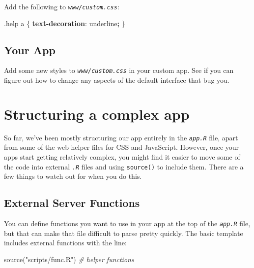 \documentclass[
  oneside]{book}
\newenvironment{Shaded}{\begin{snugshade}}{\end{snugshade}}
\newcommand{\CommentTok}[1]{\textcolor[rgb]{0.56,0.35,0.01}{\textit{#1}}}
\newcommand{\DecValTok}[1]{\textcolor[rgb]{0.00,0.00,0.81}{#1}}
\newcommand{\FunctionTok}[1]{\textcolor[rgb]{0.00,0.00,0.00}{#1}}
\newcommand{\KeywordTok}[1]{\textcolor[rgb]{0.13,0.29,0.53}{\textbf{#1}}}
\newcommand{\NormalTok}[1]{#1}
\newcommand{\OperatorTok}[1]{\textcolor[rgb]{0.81,0.36,0.00}{\textbf{#1}}}
\newcommand{\StringTok}[1]{\textcolor[rgb]{0.31,0.60,0.02}{#1}}
\begin{document}
Add the following to \textit{\texttt{www/custom.css}}:

\begin{Shaded}
\begin{Highlighting}[]
\FunctionTok{.help}\NormalTok{ a \{ }\KeywordTok{text{-}decoration}\NormalTok{: }\DecValTok{underline}\OperatorTok{;}\NormalTok{ \}}
\end{Highlighting}
\end{Shaded}

\hypertarget{your-app-web}{%
\section{Your App}\label{your-app-web}}

Add some new styles to \textit{\texttt{www/custom.css}} in your custom app. See if you can figure out how to change any aspects of the default interface that bug you.

\hypertarget{structure}{%
\chapter{Structuring a complex app}\label{structure}}

So far, we've been mostly structuring our app entirely in the \textit{\texttt{app.R}} file, apart from some of the web helper files for CSS and JavaScript. However, once your apps start getting relatively complex, you might find it easier to move some of the code into external \textit{\texttt{.R}} files and using \texttt{source()} to include them. There are a few things to watch out for when you do this.

\hypertarget{external-server-functions}{%
\section{External Server Functions}\label{external-server-functions}}

You can define functions you want to use in your app at the top of the \textit{\texttt{app.R}} file, but that can make that file difficult to parse pretty quickly. The basic template includes external functions with the line:

\begin{Shaded}
\begin{Highlighting}[]
\FunctionTok{source}\NormalTok{(}\StringTok{"scripts/func.R"}\NormalTok{)  }\CommentTok{\# helper functions}
\end{Highlighting}
\end{Shaded}
\end{document}
